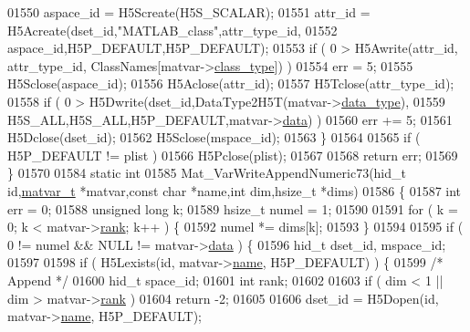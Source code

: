 \begin{DoxyCode}
{{01550         aspace\_id = H5Screate(H5S\_SCALAR);
01551         attr\_id = H5Acreate(dset\_id,\textcolor{stringliteral}{"MATLAB\_class"},attr\_type\_id,
01552                             aspace\_id,H5P\_DEFAULT,H5P\_DEFAULT);
01553         \textcolor{keywordflow}{if} ( 0 > H5Awrite(attr\_id, attr\_type\_id, ClassNames[matvar->\hyperlink{group___m_a_t_aff13035bf3265dd7d9425e5d40c839d4}{class\_type}]) )
01554             err = 5;
01555         H5Sclose(aspace\_id);
01556         H5Aclose(attr\_id);
01557         H5Tclose(attr\_type\_id);
01558         \textcolor{keywordflow}{if} ( 0 > H5Dwrite(dset\_id,DataType2H5T(matvar->\hyperlink{group___m_a_t_ab6aafe9bd77f0f077852593dec438144}{data\_type}),
01559                           H5S\_ALL,H5S\_ALL,H5P\_DEFAULT,matvar->\hyperlink{group___m_a_t_a5672978efa230bbdecdf38ede781f7fa}{data}) )
01560             err += 5;
01561         H5Dclose(dset\_id);
01562         H5Sclose(mspace\_id);
01563     \}
01564 
01565     \textcolor{keywordflow}{if} ( H5P\_DEFAULT != plist )
01566         H5Pclose(plist);
01567 
01568     \textcolor{keywordflow}{return} err;
01569 \}
01570 
01584 \textcolor{keyword}{static} \textcolor{keywordtype}{int}
01585 Mat\_VarWriteAppendNumeric73(hid\_t \textcolor{keywordtype}{id},\hyperlink{group___m_a_t_structmatvar__t}{matvar\_t} *matvar,\textcolor{keyword}{const} \textcolor{keywordtype}{char} *name,\textcolor{keywordtype}{int} dim,hsize\_t *dims)
01586 \{
01587     \textcolor{keywordtype}{int} err = 0;
01588     \textcolor{keywordtype}{unsigned} \textcolor{keywordtype}{long} k;
01589     hsize\_t numel = 1;
01590 
01591     \textcolor{keywordflow}{for} ( k = 0; k < matvar->\hyperlink{group___m_a_t_a84ba70c96ded13cc555fa75b768d9921}{rank}; k++ ) \{
01592         numel *= dims[k];
01593     \}
01594 
01595     \textcolor{keywordflow}{if} ( 0 != numel && NULL != matvar->\hyperlink{group___m_a_t_a5672978efa230bbdecdf38ede781f7fa}{data} ) \{
01596         hid\_t dset\_id, mspace\_id;
01597 
01598         \textcolor{keywordflow}{if} ( H5Lexists(\textcolor{keywordtype}{id}, matvar->\hyperlink{group___m_a_t_a5d4b55b041e3b4fb50c04337f05ad909}{name}, H5P\_DEFAULT) ) \{
01599             \textcolor{comment}{/* Append */}
01600             hid\_t space\_id;
01601             \textcolor{keywordtype}{int} rank;
01602 
01603             \textcolor{keywordflow}{if} ( dim < 1 || dim > matvar->\hyperlink{group___m_a_t_a84ba70c96ded13cc555fa75b768d9921}{rank} )
01604                 \textcolor{keywordflow}{return} -2;
01605 
01606             dset\_id = H5Dopen(\textcolor{keywordtype}{id}, matvar->\hyperlink{group___m_a_t_a5d4b55b041e3b4fb50c04337f05ad909}{name}, H5P\_DEFAULT);
}}
\end{DoxyCode}
